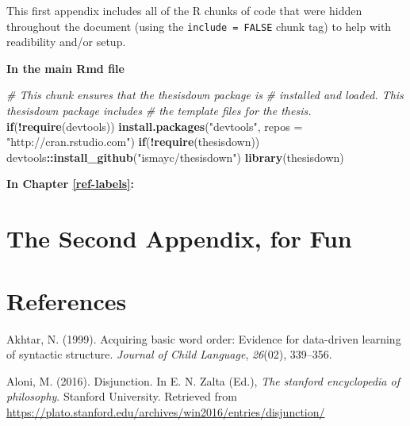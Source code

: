 \documentclass[oneside]{report}
\newenvironment{Shaded}{\begin{snugshade}}{\end{snugshade}}
\newcommand{\KeywordTok}[1]{\textcolor[rgb]{0.13,0.29,0.53}{\textbf{#1}}}
\newcommand{\DataTypeTok}[1]{\textcolor[rgb]{0.13,0.29,0.53}{#1}}
\newcommand{\StringTok}[1]{\textcolor[rgb]{0.31,0.60,0.02}{#1}}
\newcommand{\CommentTok}[1]{\textcolor[rgb]{0.56,0.35,0.01}{\textit{#1}}}
\newcommand{\ControlFlowTok}[1]{\textcolor[rgb]{0.13,0.29,0.53}{\textbf{#1}}}
\newcommand{\OperatorTok}[1]{\textcolor[rgb]{0.81,0.36,0.00}{\textbf{#1}}}
\newcommand{\NormalTok}[1]{#1}
\theoremstyle{definition}
\theoremstyle{definition}
\theoremstyle{definition}
\theoremstyle{remark}
\begin{document}
This first appendix includes all of the R chunks of code that were
hidden throughout the document (using the \texttt{include\ =\ FALSE}
chunk tag) to help with readibility and/or setup.

\textbf{In the main Rmd file}
\begin{Shaded}
\begin{Highlighting}[]
\CommentTok{# This chunk ensures that the thesisdown package is}
\CommentTok{# installed and loaded. This thesisdown package includes}
\CommentTok{# the template files for the thesis.}
\ControlFlowTok{if}\NormalTok{(}\OperatorTok{!}\KeywordTok{require}\NormalTok{(devtools))}
  \KeywordTok{install.packages}\NormalTok{(}\StringTok{"devtools"}\NormalTok{, }\DataTypeTok{repos =} \StringTok{"http://cran.rstudio.com"}\NormalTok{)}
\ControlFlowTok{if}\NormalTok{(}\OperatorTok{!}\KeywordTok{require}\NormalTok{(thesisdown))}
\NormalTok{  devtools}\OperatorTok{::}\KeywordTok{install_github}\NormalTok{(}\StringTok{"ismayc/thesisdown"}\NormalTok{)}
\KeywordTok{library}\NormalTok{(thesisdown)}
\end{Highlighting}
\end{Shaded}
\textbf{In Chapter \ref{ref-labels}:}

\chapter{The Second Appendix, for
Fun}\label{the-second-appendix-for-fun}

\chapter*{References}\label{references}


\noindent

\setlength{\parindent}{-0.20in} \setlength{\leftskip}{0.20in}
\setlength{\parskip}{8pt}

\hypertarget{refs}{}
\hypertarget{ref-akhtar1999acquiring}{}
Akhtar, N. (1999). Acquiring basic word order: Evidence for data-driven
learning of syntactic structure. \emph{Journal of Child Language},
\emph{26}(02), 339--356.

\hypertarget{ref-Aloni2016}{}
Aloni, M. (2016). Disjunction. In E. N. Zalta (Ed.), \emph{The stanford
encyclopedia of philosophy}. Stanford University. Retrieved from
\url{https://plato.stanford.edu/archives/win2016/entries/disjunction/}
\end{document}
